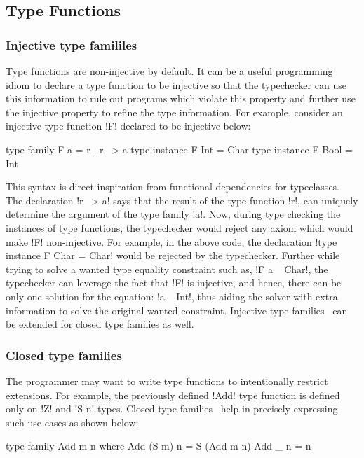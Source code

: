 \documentclass[screen,nonacm,manuscript,review]{acmart} %
\begin{document}
\subsection{Type Functions}\label{sec:rw-type-fun}
\subsubsection{Injective type famililes}
Type functions are non-injective by default. It can be a useful programming idiom to declare a type function to be injective so that the typechecker can use this information to rule out programs which violate this property and further use the injective property to refine the type information. For example, consider an injective type function !F! declared to be injective below:

\begin{CenteredBox}
\begin{code}
type family F a = r | r ~> a
type instance F Int = Char
type instance F Bool = Int
\end{code}
\end{CenteredBox}
This syntax is direct inspiration from functional dependencies for typeclasses. The declaration !r ~> a! says that the result of the type function !r!, can uniquely determine the argument of the type family !a!. Now, during type checking the instances of type functions, the typechecker would reject any axiom which would make !F! non-injective. For example, in the above code, the declaration !type instance F Char = Char! would be rejected by the typechecker. Further while trying to solve a wanted type equality constraint such as, !F a ~ Char!, the typechecker can leverage the fact that !F! is injective, and hence, there can be only one solution for the equation: !a ~ Int!, thus aiding the solver with extra information to solve the original wanted constraint. Injective type families~\cite{stolarek_injective_2015} can be extended for closed type families as well.

\subsubsection{Closed type families}
The programmer may want to write type functions to intentionally restrict extensions. For example, the previously defined !Add! type function is defined only on !Z! and !S n! types. Closed type families~\cite{eisenberg_typefamilies_2014} help in precisely expressing such use cases as shown below:

\begin{CenteredBox}
\begin{code}
type family Add m n where
  Add (S m) n = S (Add m n)
  Add _ n = n
\end{code}
\end{CenteredBox}
\end{document}
